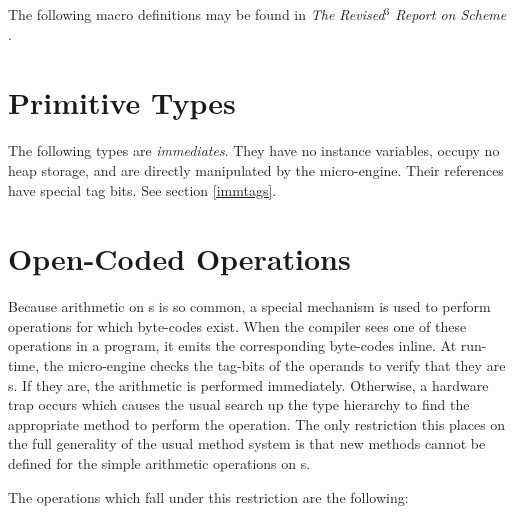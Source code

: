 


The following macro definitions may be found in {\em The Revised$^3$
Report on Scheme} \cite{R3RS}.



\section{Primitive Types}

The following types are {\em immediates}.  They have no instance
variables, occupy no heap storage, and are directly manipulated by the
micro-engine.  Their references have special tag bits.  See section
\ref{immtags}.



\section{Open-Coded Operations}

Because arithmetic on s is so common, a special mechanism
is used to perform operations for which byte-codes exist.  When the
compiler sees one of these operations in a program, it emits the
corresponding byte-codes inline. At run-time, the micro-engine checks
the tag-bits of the operands to verify that they are s.  If
they are, the arithmetic is performed immediately.  Otherwise, a
hardware trap occurs which causes the usual search up the type
hierarchy to find the appropriate method to perform the operation.
The only restriction this places on the full generality of the usual
method system is that new methods cannot be defined for the simple
arithmetic operations on s.

The operations which fall under this restriction are the following:

